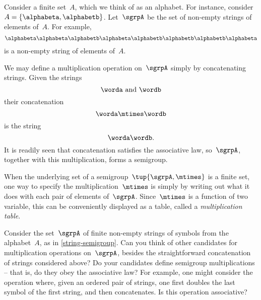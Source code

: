 \begin{example}
  \label{string-semigroup}
  Consider a finite set~$A$, which we think of as an alphabet. For instance, consider~$A = \{ \alphabeta, \alphabetb \}$.
  Let~$\sgrpA$ be the set of non-empty strings of elements of~$A$. For example,
  \begin{equation*}
    \alphabeta\alphabeta \alphabetb \alphabeta \alphabetb \alphabetb \alphabetb \alphabeta
  \end{equation*}
  is a non-empty string of elements of~$A$.

  We may define a multiplication operation on~$\sgrpA$ simply by concatenating strings. Given the strings
  \begin{equation*}
    \worda \text{ and } \wordb
  \end{equation*}
  their concatenation
  \begin{equation*}
    \worda \mtimes  \wordb
  \end{equation*}
  is the string
  \begin{equation*}
     \worda \wordb.
  \end{equation*}
  It is readily seen that concatenation satisfies the associative law, so~$\sgrpA$, together with this multiplication, forms a semigroup.
\end{example}


When the underlying set of a semigroup~$\tup{\sgrpA, \mtimes}$ is a finite set, one way to specify the multiplication~$\mtimes$ is simply by writing out what it does with each pair of elements of~$\sgrpA$.
Since~$\mtimes$ is a function of two variable, this can be conveniently displayed as a table, called a \emph{multiplication table}.


\begin{exercise}
  \label{ex:alphabet}
  Consider the set~$\sgrpA$ of finite non-empty strings of symbols from the alphabet~$A$, as in \cref{string-semigroup}. Can you think of other candidates for multiplication operations on~$\sgrpA$, besides the straightforward concatenation of strings considered above? Do your candidates define semigroup multiplications -- that is, do they obey the associative law?
  For example, one might consider the operation where, given an ordered pair of strings, one first doubles the last symbol of the first string, and then concatenates. Is this operation associative?
\end{exercise}
\begin{solution}
\end{solution}


